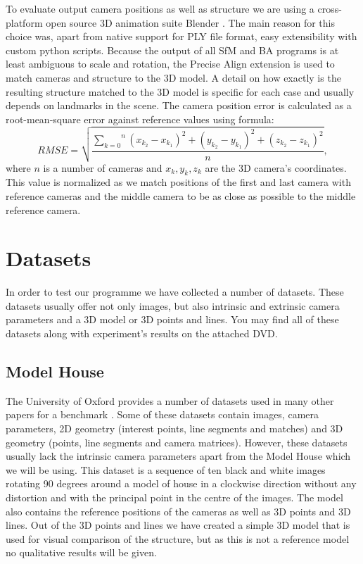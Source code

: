 \vspace{.5cm}
To evaluate output camera positions as well as structure we are using a cross-platform open source 3D animation suite Blender \cite{www:blender}. The main reason for this choice was, apart from native support for PLY file format, easy extensibility with custom python scripts. Because the output of all SfM and BA programs is at least ambiguous to scale and rotation, the Precise Align extension \cite{www:blender_precise_align} is used to match cameras and structure to the 3D model. A detail on how exactly is the resulting structure matched to the 3D model is specific for each case and usually depends on landmarks in the scene. The camera position error is calculated as a root-mean-square error against reference values using formula:
\begin{equation}
	RMSE=\sqrt{\frac{\overset{n}{\underset{k=0}{\sum}} (x_{k_2}-x_{k_1})^2 + (y_{k_2}-y_{k_1})^2 + (z_{k_2}-z_{k_1})^2}{n}},
	\label{eq:RMSE}
\end{equation}
where $n$ is a number of cameras and $x_{k}, y_k, z_k$ are the 3D camera's coordinates. This value is normalized as we match positions of the first and last camera with reference cameras and the middle camera to be as close as possible to the middle reference camera.

\section{Datasets}
In order to test our programme we have collected a number of datasets. These datasets usually offer not only images, but also intrinsic and extrinsic camera parameters and a 3D model or 3D points and lines. You may find all of these datasets along with experiment's results on the attached DVD.

\subsection*{Model House}
The University of Oxford provides a number of  datasets used in many other papers for a benchmark \cite{www:oxford_models}. Some of these datasets contain images, camera parameters, 2D geometry (interest points, line segments and matches) and 3D geometry (points, line segments and camera matrices). However, these datasets usually lack the intrinsic camera parameters apart from the Model House which we will be using. This dataset is a sequence of ten black and white images rotating 90 degrees around a model of house in a clockwise direction without any distortion and with the principal point in the centre of the images. The model also contains the reference positions of the cameras as well as 3D points and 3D lines. Out of the 3D points and lines we have created a simple 3D model that is used for visual comparison of the structure, but as this is not a reference model no qualitative results will be given.

